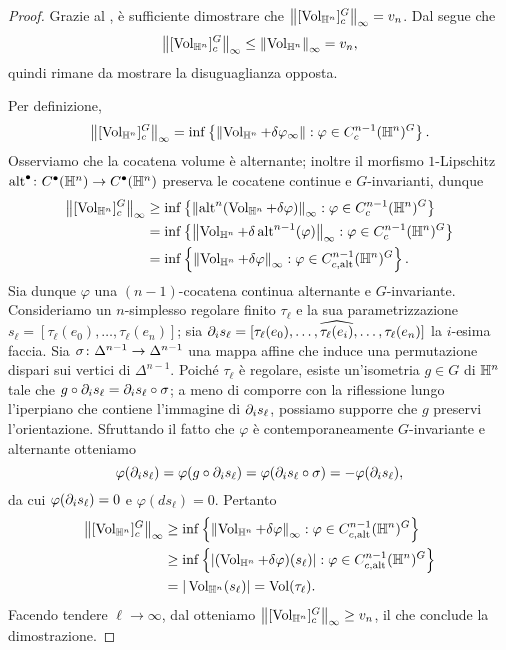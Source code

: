 \begin{proof}
Grazie al , è sufficiente dimostrare che $\left\lVert [\operatorname{Vol}_{\mathbb{H}^n}]^G_c\right\rVert_\infty=v_n$. Dal  segue che
\[
\left\lVert [\operatorname{Vol}_{\mathbb{H}^n}]^G_c\right\rVert_\infty\le\left\lVert \operatorname{Vol}_{\mathbb{H}^n}\right\rVert_\infty=v_n,
\]
quindi rimane da mostrare la disuguaglianza opposta.

Per definizione,
\[
\left\lVert [\operatorname{Vol}_{\mathbb{H}^n}]^G_c\right\rVert_\infty=\inf\left\{\left\lVert \operatorname{Vol}_{\mathbb{H}^n}+\delta\varphi_\infty\right\rVert:\varphi\in C^{n-1}_c(\mathbb{H}^n)^G\right\}.
\]
Osserviamo che la cocatena volume è alternante; inoltre il morfismo $1$-Lipschitz $\map{\alt^\bul}{C^\bul(\HH^n)}{C^\bul(\HH^n)}$ preserva le cocatene continue e $G$-invarianti, dunque
\begin{align*}
\left\lVert [\operatorname{Vol}_{\mathbb{H}^n}]^G_c\right\rVert_\infty&\ge\inf\left\{\left\lVert \operatorname{alt}^n(\operatorname{Vol}_{\mathbb{H}^n}+\delta\varphi)\right\rVert_\infty:\varphi\in C^{n-1}_c(\mathbb{H}^n)^G\right\}\\
&=\inf\left\{\left\lVert \operatorname{Vol}_{\mathbb{H}^n}+\delta\operatorname{alt}^{n-1}(\varphi)\right\rVert_\infty:\varphi\in C^{n-1}_c(\mathbb{H}^n)^G\right\}\\
&=\inf\left\{\left\lVert \operatorname{Vol}_{\mathbb{H}^n}+\delta\varphi\right\rVert_\infty:\varphi\in C^{n-1}_{c,\operatorname{alt}}(\mathbb{H}^n)^G\right\}.
\end{align*}
Sia dunque $\varphi$ una $(n-1)$-cocatena continua alternante e $G$-invariante. Consideriamo un $n$-simplesso regolare finito $\tau_\ell$ e la sua parametrizzazione $s_\ell=[\tau_\ell(e_0),\ldots,\tau_\ell(e_n)]$; sia $\partial_is_\ell=[\tau_\ell(e_0),\ldots,\widehat{\tau_\ell(e_i)},\ldots,\tau_\ell(e_n)]$ la $i$-esima faccia. Sia $\map{\sigma}{\Delta^{n-1}}{\Delta^{n-1}}$ una mappa affine che induce una permutazione dispari sui vertici di $\Delta^{n-1}$. Poiché $\tau_\ell$ è regolare, esiste un'isometria $g\in G$ di $\mathbb{H}^n$ tale che $g\circ\partial_i s_\ell=\partial_i s_\ell\circ\sigma$; a meno di comporre con la riflessione lungo l'iperpiano che contiene l'immagine di $\partial_i s_\ell$, possiamo supporre che $g$ preservi l'orientazione.  Sfruttando il fatto che $\varphi$ è contemporaneamente $G$-invariante e alternante otteniamo
\[
\varphi(\partial_i s_\ell)=\varphi(g\circ\partial_i s_\ell)=\varphi(\partial_i s_\ell\circ\sigma)=-\varphi(\partial_i s_\ell),
\]
da cui $\varphi(\partial_i s_\ell)=0$ e $\varphi(ds_\ell)=0$. Pertanto
\begin{align*}
\left\lVert [\operatorname{Vol}_{\mathbb{H}^n}]^G_c\right\rVert_\infty&\ge\inf\left\{\left\lVert \operatorname{Vol}_{\mathbb{H}^n}+\delta\varphi\right\rVert_\infty:\varphi\in C^{n-1}_{c,\operatorname{alt}}(\mathbb{H}^n)^G\right\}\\
&\ge\inf\left\{|(\operatorname{Vol}_{\mathbb{H}^n}+\delta\varphi)(s_\ell)|:\varphi\in C^{n-1}_{c,\operatorname{alt}}(\mathbb{H}^n)^G\right\}\\
&=|\operatorname{Vol}_{\mathbb{H}^n}(s_\ell)|=\operatorname{Vol}(\tau_\ell).
\end{align*}
Facendo tendere $\ell\to\infty$, dal  otteniamo $\left\lVert [\operatorname{Vol}_{\mathbb{H}^n}]^G_c\right\rVert_{\infty}\ge v_n$, il che conclude la dimostrazione.
\end{proof}

